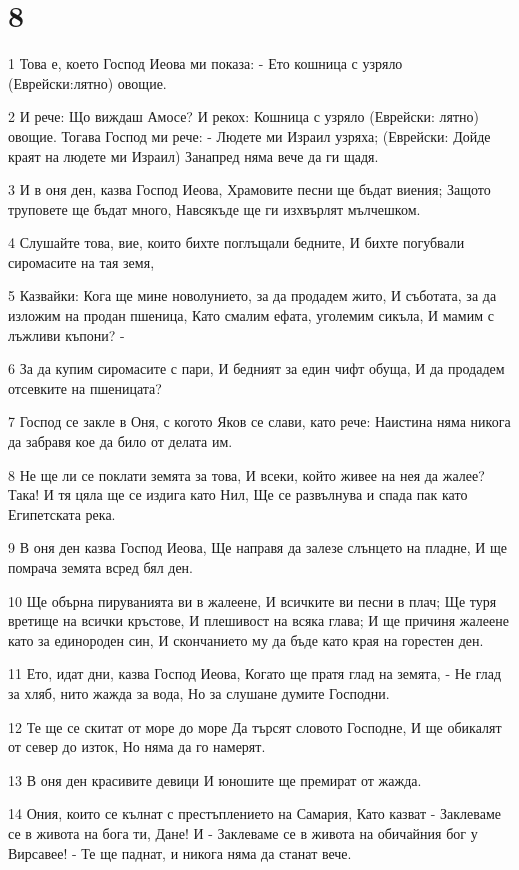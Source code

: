 \chapter{8}

\par 1 Това е, което Господ Иеова ми показа: - Ето кошница с узряло (Еврейски:лятно) овощие.
\par 2 И рече: Що виждаш Амосе? И рекох: Кошница с узряло (Еврейски: лятно) овощие. Тогава Господ ми рече: - Людете ми Израил узряха; (Еврейски: Дойде краят на людете ми Израил) Занапред няма вече да ги щадя.
\par 3 И в оня ден, казва Господ Иеова, Храмовите песни ще бъдат виения; Защото труповете ще бъдат много, Навсякъде ще ги изхвърлят мълчешком.
\par 4 Слушайте това, вие, които бихте поглъщали бедните, И бихте погубвали сиромасите на тая земя,
\par 5 Казвайки: Кога ще мине новолунието, за да продадем жито, И съботата, за да изложим на продан пшеница, Като смалим ефата, уголемим сикъла, И мамим с лъжливи къпони? -
\par 6 За да купим сиромасите с пари, И бедният за един чифт обуща, И да продадем отсевките на пшеницата?
\par 7 Господ се закле в Оня, с когото Яков се слави, като рече: Наистина няма никога да забравя кое да било от делата им.
\par 8 Не ще ли се поклати земята за това, И всеки, който живее на нея да жалее? Така! И тя цяла ще се издига като Нил, Ще се развълнува и спада пак като Египетската река.
\par 9 В оня ден казва Господ Иеова, Ще направя да залезе слънцето на пладне, И ще помрача земята всред бял ден.
\par 10 Ще обърна пируванията ви в жалеене, И всичките ви песни в плач; Ще туря вретище на всички кръстове, И плешивост на всяка глава; И ще причиня жалеене като за единороден син, И скончанието му да бъде като края на горестен ден.
\par 11 Ето, идат дни, казва Господ Иеова, Когато ще пратя глад на земята, - Не глад за хляб, нито жажда за вода, Но за слушане думите Господни.
\par 12 Те ще се скитат от море до море Да търсят словото Господне, И ще обикалят от север до изток, Но няма да го намерят.
\par 13 В оня ден красивите девици И юношите ще премират от жажда.
\par 14 Ония, които се кълнат с престъплението на Самария, Като казват - Заклеваме се в живота на бога ти, Дане! И - Заклеваме се в живота на обичайния бог у Вирсавее! - Те ще паднат, и никога няма да станат вече.

